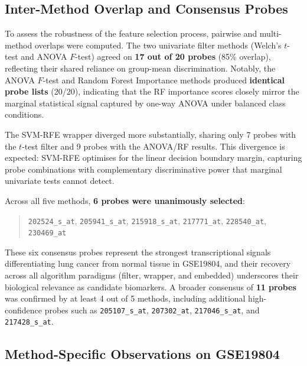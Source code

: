 \subsection{Inter-Method Overlap and Consensus Probes}

To assess the robustness of the feature selection process, pairwise and multi-method overlaps were computed. The two univariate filter methods (Welch's $t$-test and ANOVA $F$-test) agreed on \textbf{17 out of 20 probes} (85\% overlap), reflecting their shared reliance on group-mean discrimination. Notably, the ANOVA $F$-test and Random Forest Importance methods produced \textbf{identical probe lists} (20/20), indicating that the RF importance scores closely mirror the marginal statistical signal captured by one-way ANOVA under balanced class conditions.

The SVM-RFE wrapper diverged more substantially, sharing only 7 probes with the $t$-test filter and 9 probes with the ANOVA/RF results. This divergence is expected: SVM-RFE optimises for the linear decision boundary margin, capturing probe combinations with complementary discriminative power that marginal univariate tests cannot detect.

Across all five methods, \textbf{6 probes were unanimously selected}:
\begin{quote}
\texttt{202524\_s\_at}, \texttt{205941\_s\_at}, \texttt{215918\_s\_at}, \texttt{217771\_at}, \texttt{228540\_at}, \texttt{230469\_at}
\end{quote}
These six consensus probes represent the strongest transcriptional signals differentiating lung cancer from normal tissue in GSE19804, and their recovery across all algorithm paradigms (filter, wrapper, and embedded) underscores their biological relevance as candidate biomarkers. A broader consensus of \textbf{11 probes} was confirmed by at least 4 out of 5 methods, including additional high-confidence probes such as \texttt{205107\_s\_at}, \texttt{207302\_at}, \texttt{217046\_s\_at}, and \texttt{217428\_s\_at}.

\subsection{Method-Specific Observations on GSE19804}

